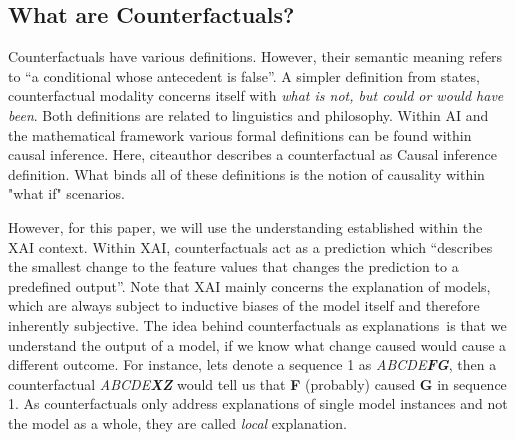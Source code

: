 \documentclass[12pt,a4paper]{report}
\begin{document}
\subsection{What are Counterfactuals?}
Counterfactuals have various definitions. However, their semantic meaning refers to \enquote{a conditional whose antecedent is false}\autocite{_Counterfactual_}. A simpler definition from \citeauthor{starr_Counterfactuals_2021} states, counterfactual modality concerns itself with \emph{what is not, but could or would have been}.
Both definitions are related to linguistics and philosophy. Within AI and the mathematical framework various formal definitions can be found within causal inference\autocite{hitchcock_CausalModels_2020}. Here, citeauthor describes a counterfactual as {Causal inference definition}. What binds all of these definitions is the notion of causality within "what if" scenarios.

However, for this paper, we will use the understanding established within the \gls{XAI} context. Within \gls{XAI}, counterfactuals act as a prediction which \enquote{describes the smallest change to the feature values that changes the prediction to a predefined output}\autocite{molnar2019}. Note that \gls{XAI} mainly concerns the explanation of models, which are always subject to inductive biases of the model itself and therefore inherently subjective. The idea behind counterfactuals as explanations\footnotemark ~is that we understand the output of a model, if we know what change caused would cause a different outcome. For instance, lets denote a sequence 1 as \textit{ABCDE\textbf{FG}}, then a counterfactual \textit{ABCDE\textbf{XZ}} would tell us that \textbf{F} (probably) caused \textbf{G} in sequence 1. As counterfactuals only address explanations of single model instances and not the model as a whole, they are called \emph{local} explanation.
\end{document}
